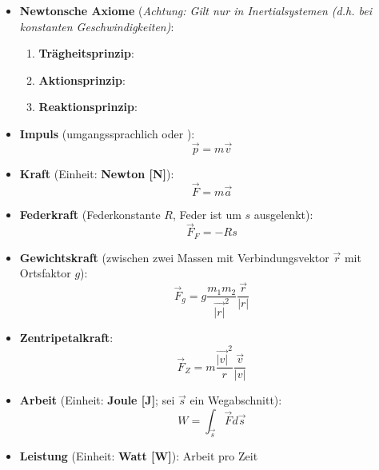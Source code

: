 \begin{itemize}
	\item \textbf{Newtonsche Axiome} (\textit{Achtung: Gilt nur in Inertialsystemen (d.h. bei konstanten Geschwindigkeiten)}:
	\begin{enumerate}
		\item \textbf{Trägheitsprinzip}: 
		\item \textbf{Aktionsprinzip}: 
		\item \textbf{Reaktionsprinzip}: 
	\end{enumerate}
	\item \textbf{Impuls} (umgangssprachlich  oder ):
	\begin{equation}
		\vec{p} = m\vec{v}
	\end{equation}
	\item \textbf{Kraft} (Einheit: \textbf{Newton [N]}):
	\begin{equation}
		\vec{F} = m\vec{a}
	\end{equation}
	\item \textbf{Federkraft} (Federkonstante $R$, Feder ist um $s$ ausgelenkt):
	\begin{equation}
		\vec{F}_F = -Rs
	\end{equation}
	\item \textbf{Gewichtskraft} (zwischen zwei Massen mit Verbindungsvektor $\vec{r}$ mit Ortsfaktor $g$):
	\begin{equation}
		\vec{F}_g = g\frac{m_1m_2}{\vec{|r|}^2}\frac{\vec{r}}{|r|}
	\end{equation}
	\item \textbf{Zentripetalkraft}:
	\begin{equation}
		\vec{F}_Z = m\frac{\vec{|v|}^2}{r}\frac{\vec{v}}{|v|}
	\end{equation}
	\item \textbf{Arbeit} (Einheit: \textbf{Joule [J]}; sei $\vec{s}$ ein Wegabschnitt):
	\begin{equation}
		W = \int_{\vec{s}} \vec{F}d\vec{s}
	\end{equation}
	\item \textbf{Leistung} (Einheit: \textbf{Watt [W]}): Arbeit pro Zeit

\end{itemize}
